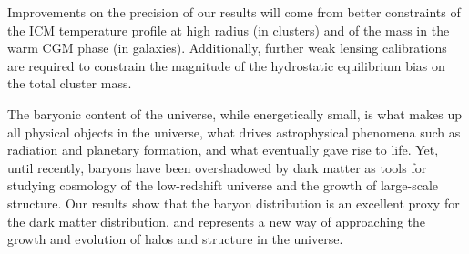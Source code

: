 Improvements on the precision of our results will come from better
constraints of the ICM temperature profile at high radius (in
clusters) and of the mass in the warm CGM phase (in
galaxies). Additionally, further weak lensing calibrations are
required to constrain the magnitude of the hydrostatic equilibrium
bias on the total cluster mass. 

The baryonic content of the universe, while energetically small, is
what makes up all physical objects in the universe, what drives
astrophysical phenomena such as radiation and planetary formation, and
what eventually gave rise to life. Yet, until recently, baryons have
been overshadowed by dark matter as tools for studying cosmology of
the low-redshift universe and the growth of large-scale structure. Our
results show that the baryon distribution is an excellent proxy for
the dark matter distribution, and represents a new way of approaching
the growth and evolution of halos and structure in the universe. 
